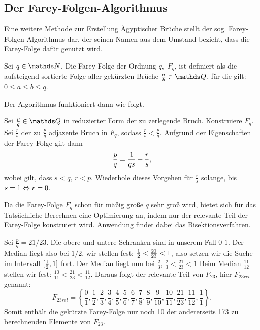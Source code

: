 \subsection{Der Farey-Folgen-Algorithmus}
Eine weitere Methode zur Erstellung Ägyptischer Brüche stellt der sog. Farey-Folgen-Algorithmus dar, der seinen Namen aus dem Umstand bezieht, dass die Farey-Folge dafür genutzt wird.
\begin{def1}
	Sei $q \in \N$. Die Farey-Folge der Ordnung $q$, $\, F_q$, ist definiert als die aufsteigend sortierte Folge aller gekürzten Brüche $\frac{a}{b} \in \Q$, für die gilt:
	$0\leq a \leq b \leq q$.
\end{def1}
Der Algorithmus funktioniert dann wie folgt.
\begin{algorithm}
	Sei $\frac{p}{q} \in \Q$ in reduzierter Form der zu zerlegende Bruch. Konstruiere $F_q$. Sei $\frac{r}{s}$ der zu $\frac{p}{q}$ adjazente Bruch in $F_q$, sodass $\frac{r}{s} < \frac{p}{q}$. Aufgrund der Eigenschaften der Farey-Folge gilt dann
	$$\frac{p}{q} = \frac{1}{qs} + \frac{r}{s},$$
	wobei gilt, dass $s<q,\, r<p$. Wiederhole dieses Vorgehen für $\frac{r}{s}$ solange, bis $s=1 \Leftrightarrow r=0$.
\end{algorithm}
Da die Farey-Folge $F_q$ schon für mäßig große $q$ sehr groß wird, bietet sich für das Tatsächliche Berechnen eine Optimierung an, indem nur der relevante Teil der Farey-Folge konstruiert wird. Anwendung findet dabei das Bisektionsverfahren.
\begin{bsp}
	Sei $\frac{p}{q} = 21/23$. Die obere und untere Schranken sind in unserem Fall $0$ \bzw $1$. Der Median liegt also bei $1/2$, wir stellen fest: $\frac{1}{2}<\frac{21}{23}<1$, also setzen wir die Suche im Intervall $[\frac{1}{2}, 1]$ fort. Der Median liegt nun bei $\frac{2}{3}$, $\frac{2}{3}<\frac{21}{23}<1$ \usw
	Beim Median $\frac{11}{12}$ stellen wir fest: $\frac{10}{11} < \frac{21}{23} < \frac{11}{12}.$ Daraus folgt der relevante Teil von $F_{23}$, hier $F_{23rel}$ genannt: $$F_{23rel} = \left\{\frac{0}{1}, \frac{1}{2}, \frac{2}{3}, \frac{3}{4}, \frac{4}{5}, \frac{5}{6}, \frac{6}{7}, \frac{7}{8}, \frac{8}{9}, \frac{9}{10}, \frac{10}{11}, \frac{21}{23}, \frac{11}{12}, \frac{1}{1}\right\}.$$
	Somit enthält die gekürzte Farey-Folge nur noch 10 der andererseits 173 zu berechnenden Elemente von $F_{23}$.
\end{bsp}

